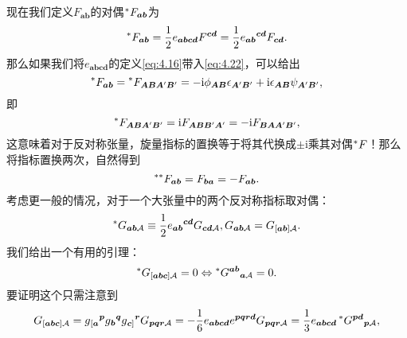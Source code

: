 现在我们定义$F_{\boldsymbol{ab}}$的对偶$\prescript{*}{}{} F_{\boldsymbol{ab}}$为
\begin{equation*}
	\prescript{*}{}{} F_{\boldsymbol{ab}} =\frac{1}{2} e_{\boldsymbol{abcd}} F^{\boldsymbol{cd}} =\frac{1}{2} e{_{\boldsymbol{ab}}}^{\boldsymbol{cd}} F_{\boldsymbol{cd}} .
\end{equation*}
那么如果我们将$e_{\boldsymbol{abcd}}$的定义\ref{eq:4.16}带入\ref{eq:4.22}，可以给出
\begin{equation}
	\prescript{*}{}{} F_{\boldsymbol{ab}} =\prescript{*}{}{} F_{\boldsymbol{ABA} '\boldsymbol{B} '} =-\mathrm{i} \phi _{\boldsymbol{AB}} \epsilon _{\boldsymbol{A} '\boldsymbol{B} '} +\mathrm{i} \epsilon _{\boldsymbol{AB}} \psi _{\boldsymbol{A} '\boldsymbol{B} '} ,
	\label{eq:4.24}
\end{equation}
即
\begin{equation*}
	\prescript{*}{}{} F_{\boldsymbol{ABA} '\boldsymbol{B} '} =\mathrm{i} F_{\boldsymbol{ABB} '\boldsymbol{A} '} =-\mathrm{i} F_{\boldsymbol{BAA} '\boldsymbol{B} '} ,
\end{equation*}
这意味着对于反对称张量，旋量指标的置换等于将其代换成$\pm \mathrm{i}$乘其对偶$\prescript{*}{}{} F$！那么将指标置换两次，自然得到
\begin{equation*}
	\prescript{**}{}{} F_{\boldsymbol{ab}} =F_{\boldsymbol{ba}} =-F_{\boldsymbol{ab}} .
\end{equation*}
考虑更一般的情况，对于一个大张量中的两个反对称指标取对偶：
\begin{equation*}
	\prescript{*}{}{} G_{\boldsymbol{ab}\mathcal{A}} \equiv \frac{1}{2} e{_{\boldsymbol{ab}}}^{\boldsymbol{cd}} G_{\boldsymbol{cd}\mathcal{A}} ,G_{\boldsymbol{ab}\mathcal{A}} =G_{[\boldsymbol{ab}]\mathcal{A}} .
\end{equation*}
我们给出一个有用的引理：
\begin{equation}
	\prescript{*}{}{} G_{[\boldsymbol{abc}]\mathcal{A}} =0\Leftrightarrow \prescript{*}{}{} G^{\boldsymbol{ab}}{}_{\boldsymbol{a}\mathcal{A}} =0.
	\label{eq:4.25}
\end{equation}
要证明这个只需注意到
\begin{equation*}
	G_{[\boldsymbol{abc}]\mathcal{A}} =g{_{[\boldsymbol{a}}}^{\boldsymbol{p}} g{_{\boldsymbol{b}}}^{\boldsymbol{q}} g{_{\boldsymbol{c}]}}^{\boldsymbol{r}} G_{\boldsymbol{pqr}\mathcal{A}} =-\frac{1}{6} e_{\boldsymbol{abcd}} e^{\boldsymbol{pqrd}} G_{\boldsymbol{pqr}\mathcal{A}} =\frac{1}{3} e_{\boldsymbol{abcd}}\prescript{*}{}{} G^{\boldsymbol{pd}}{}_{\boldsymbol{p}\mathcal{A}} ,
\end{equation*}
